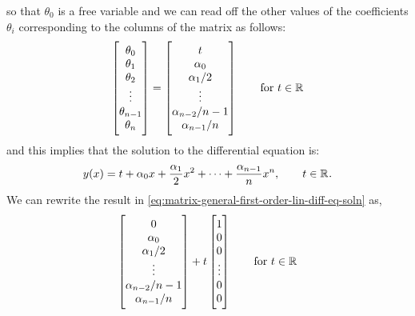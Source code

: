 \documentclass[MathsNotesBase.tex]{subfiles}
\begin{document}
{		so that $\theta_0$ is a free variable and we can read off the other values of the coefficients $\theta_i$ corresponding to the columns of the matrix as follows:
		\begin{equation}\label{eq:matrix-general-first-order-lin-diff-eq-soln}
			\begin{bmatrix}\theta_0\\\theta_1\\\theta_2\\\vdots\\\theta_{n-1}\\\theta_n\end{bmatrix} =
			\begin{bmatrix}t\\\alpha_0\\\alpha_1/2\\\vdots\\\alpha_{n-2}/n-1\\\alpha_{n-1}/n\end{bmatrix} \hspace{20pt} \text{for } t \in \mathbb{R}^{}
		\end{equation}
		and this implies that the solution to the differential equation is:
		\begin{equation}\label{eq:general-first-order-lin-diff-eq-soln}
			y(x) = t + \alpha_0 x + \frac{\alpha_1}{2} x^2 + \cdots + \frac{\alpha_{n-1}}{n} x^n, \hspace{20pt} t \in \mathbb{R}^{}.
		\end{equation}
		We can rewrite the result in \autoref{eq:matrix-general-first-order-lin-diff-eq-soln} as,
		\begin{equation}
			\begin{bmatrix}0\\\alpha_0\\\alpha_1/2\\\vdots\\\alpha_{n-2}/n-1\\\alpha_{n-1}/n\end{bmatrix} + t\begin{bmatrix}1\\0\\0\\\vdots\\0\\0\end{bmatrix}
			\hspace{20pt} \text{for } t \in \mathbb{R}^{}
		\end{equation}
}
\end{document}
